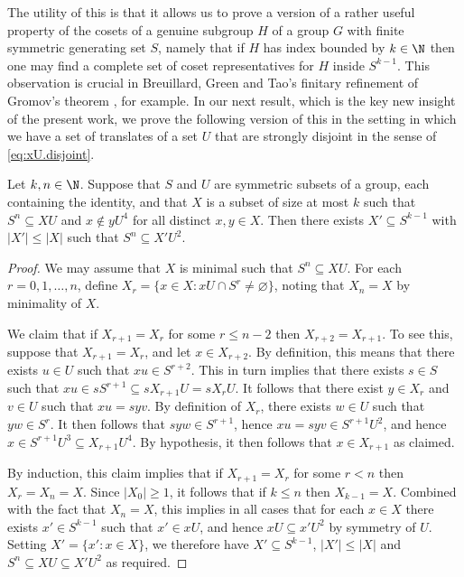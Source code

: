The utility of this is that it allows us to prove a version of a rather useful property of the cosets of a genuine subgroup $H$ of a group $G$ with finite symmetric generating set $S$, namely that if $H$ has index bounded by $k\in\N$ then one may find a complete set of coset representatives for $H$ inside $S^{k-1}$. This observation is crucial in Breuillard, Green and Tao's finitary refinement of Gromov's theorem \cite[Corollary 11.2]{bgt}, for example. In our next result, which is the key new insight of the present work, we prove the following version of this in the setting in which we have a set of translates of a set $U$ that are strongly disjoint in the sense of \cref{eq:xU.disjoint}.
\begin{prop}\label{prop:translates.app.grp.bdd.reps}
Let $k,n\in\N$. Suppose that $S$ and $U$ are symmetric subsets of a group, each containing the identity, and that $X$ is a subset of size at most $k$ such that $S^n\subseteq XU$ and $x\notin yU^4$ for all distinct $x,y\in X$. Then there exists $X'\subseteq S^{k-1}$ with $|X'|\le|X|$ such that $S^n\subseteq X'U^2$.
\end{prop}
\begin{proof}
We may assume that $X$ is minimal such that $S^n\subseteq XU$. For each $r=0,1,\ldots,n$, define $X_r=\{x\in X:xU\cap S^r\ne\varnothing\}$, noting that $X_n=X$ by minimality of $X$.

We claim that if $X_{r+1}=X_r$ for some $r\le n-2$ then $X_{r+2}=X_{r+1}$. To see this, suppose that $X_{r+1}=X_r$, and let $x\in X_{r+2}$. By definition, this means that there exists $u\in U$ such that $xu\in S^{r+2}$. This in turn implies that there exists $s\in S$ such that $xu\in sS^{r+1}\subseteq sX_{r+1}U=sX_rU$. It follows that there exist $y\in X_r$ and $v\in U$ such that $xu=syv$. By definition of $X_r$, there exists $w\in U$ such that $yw\in S^r$. It then follows that $syw\in S^{r+1}$, hence $xu=syv\in S^{r+1}U^2$, and hence $x\in S^{r+1}U^3\subseteq X_{r+1}U^4$. By hypothesis, it then follows that $x\in X_{r+1}$ as claimed.

By induction, this claim implies that if $X_{r+1}=X_r$ for some $r< n$ then $X_r=X_n=X$. Since $|X_0|\ge1$, it follows that if $k\le n$ then $X_{k-1}=X$. Combined with the fact that $X_n=X$, this implies in all cases that for each $x\in X$ there exists $x'\in S^{k-1}$ such that $x'\in xU$, and hence $xU\subseteq x'U^2$ by symmetry of $U$. Setting $X'=\{x':x\in X\}$, we therefore have $X'\subseteq S^{k-1}$, $|X'|\le|X|$ and $S^n\subseteq XU\subseteq X'U^2$ as required.
\end{proof}


